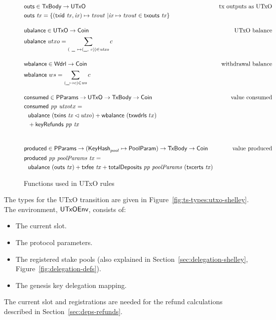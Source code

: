 \begin{figure}[htb]
  \begin{align*}
    & \fun{outs} \in \TxBody \to \UTxO
    & \text{tx outputs as UTxO} \\
    & \fun{outs} ~ \var{tx} =
        \left\{
          (\fun{txid} ~ \var{tx}, \var{ix}) \mapsto \var{txout} ~
          \middle|
          \var{ix} \mapsto \var{txout} \in \txouts{tx}
        \right\}
    \nextdef
    & \fun{ubalance} \in \UTxO \to \Coin
    & \text{UTxO balance} \\
    & \fun{ubalance} ~ utxo = \sum_{(~\wcard ~ \mapsto (\wcard, ~c)) \in \var{utxo}} c
    \nextdef
    & \fun{wbalance} \in \Wdrl \to \Coin
    & \text{withdrawal balance} \\
    & \fun{wbalance} ~ ws = \sum_{(\wcard\mapsto c)\in\var{ws}} c
    \nextdef
    & \fun{consumed} \in \PParams \to \UTxO \to \TxBody \to \Coin
    & \text{value consumed} \\
    & \consumed{pp}{utxo}{tx} = \\
    & ~~\ubalance{(\txins{tx} \restrictdom \var{utxo})} +
        \fun{wbalance}~(\fun{txwdrls}~{tx}) \\
    & ~~ + \keyRefunds{pp}{tx} \\
    \nextdef
    & \fun{produced} \in \PParams \to (\KeyHash_{pool}\mapsto\PoolParam) \to \TxBody \to \Coin
    & \text{value produced} \\
    & \fun{produced}~\var{pp}~\var{poolParams}~\var{tx} = \\
    &~~\ubalance{(\outs{tx})}
    + \txfee{tx} + \totalDeposits{pp}{poolParams}{(\txcerts{tx})}\\
  \end{align*}

  \caption{Functions used in UTxO rules}
  \label{fig:functions:utxo}
\end{figure}

\clearpage


The types for the UTxO transition are given in Figure~\ref{fig:ts-types:utxo-shelley}.
The environment, $\mathsf{UTxOEnv}$, consists of:

\begin{itemize}
  \item The current slot.
  \item The protocol parameters.
  \item The registered stake pools
    (also explained in Section~\ref{sec:delegation-shelley},
    Figure~\ref{fig:delegation-defs}).
  \item The genesis key delegation mapping.
\end{itemize}
The current slot and registrations are needed for the refund calculations
described in Section~\ref{sec:deps-refunds}.

